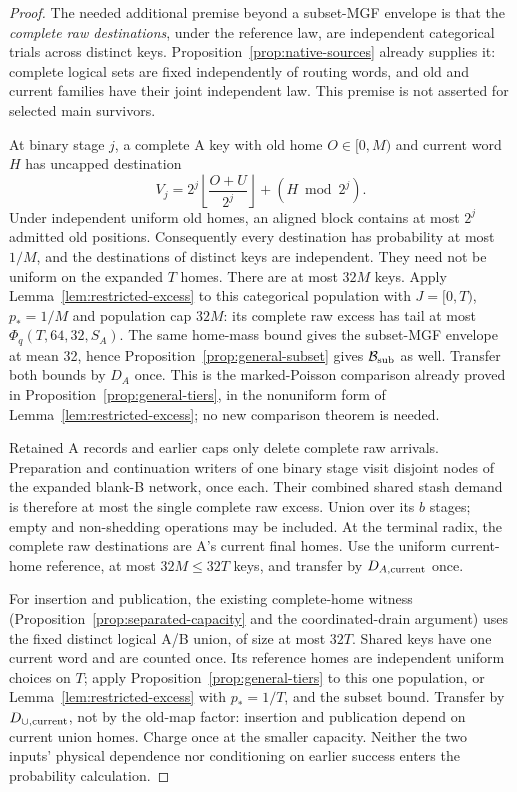 \documentclass[11pt]{article}
\theoremstyle{definition}
\theoremstyle{remark}
\begin{document}
\begin{proof}
The needed additional premise beyond a subset-MGF envelope is that the
\emph{complete raw destinations}, under the reference law, are independent
categorical trials across distinct keys. Proposition~\ref{prop:native-sources}
already supplies it: complete logical sets are fixed independently of
routing words, and old and current families have their joint independent
law. This premise is not asserted for selected main survivors.

At binary stage $j$, a complete A key with old home $O\in[0,M)$ and
current word $H$ has uncapped destination
\[
 V_j=2^j\left\lfloor\frac{O+U}{2^j}\right\rfloor+(H\bmod2^j).
\]
Under independent uniform old homes, an aligned block contains at most
$2^j$ admitted old positions. Consequently every destination has
probability at most $1/M$, and the destinations of distinct keys are
independent. They need not be uniform on the expanded $T$ homes.
There are at most $32M$ keys. Apply Lemma~\ref{lem:restricted-excess}
to this categorical population with $J=[0,T)$, $p_*=1/M$ and population
cap $32M$: its complete raw excess has tail at most
$\Phi_q(T,64,32,S_A)$. The same home-mass bound gives the subset-MGF
envelope at mean 32, hence Proposition~\ref{prop:general-subset} gives
$\mathcal B_{\rm sub}$ as well. Transfer both bounds by $D_A$ once.
This is the marked-Poisson comparison already proved in
Proposition~\ref{prop:general-tiers}, in the nonuniform form of
Lemma~\ref{lem:restricted-excess}; no new comparison theorem is needed.

Retained A records and earlier caps only delete complete raw arrivals.
Preparation and continuation writers of one binary stage visit disjoint
nodes of the expanded blank-B network, once each. Their combined shared
stash demand is therefore at most the single complete raw excess.
Union over its $b$ stages; empty and non-shedding operations may be
included. At the terminal radix, the complete raw destinations are A's
current final homes. Use the uniform current-home reference, at most
$32M\le32T$ keys, and transfer by $D_{A,\rm current}$ once.

For insertion and publication, the existing complete-home witness
(Proposition~\ref{prop:separated-capacity} and the coordinated-drain
argument) uses the fixed distinct logical A/B union, of size at most
$32T$. Shared keys have one current word and are counted once. Its
reference homes are independent uniform choices on $T$; apply
Proposition~\ref{prop:general-tiers} to this one population, or
Lemma~\ref{lem:restricted-excess} with $p_*=1/T$, and the subset bound.
Transfer by $D_{\cup,\rm current}$, not by the old-map factor: insertion
and publication depend on current union homes. Charge once at the smaller
capacity. Neither the two inputs' physical dependence nor conditioning
on earlier success enters the probability calculation.
\end{proof}
\end{document}
